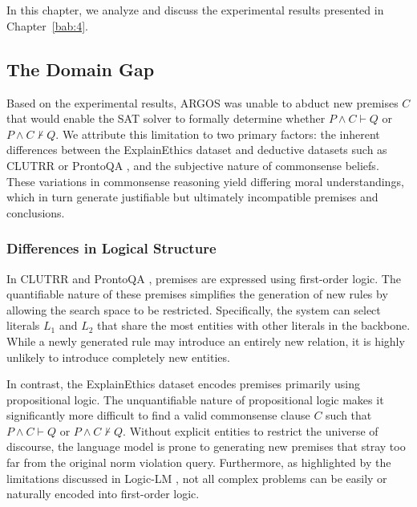 \chapter{\babLima}
\label{bab:5}

In this chapter, we analyze and discuss the experimental results presented in Chapter~\ref{bab:4}.


\section{The Domain Gap}
\label{sec:rq1Analysis}
Based on the experimental results, ARGOS was unable to abduct new premises $C$ that would enable the SAT solver to formally determine whether $P \land C \vdash Q$ or $P \land C \nvdash Q$. We attribute this limitation to two primary factors: the inherent differences between the ExplainEthics dataset and deductive datasets such as CLUTRR \citep{sinha-etal-2019-clutrr} or ProntoQA \citep{PrOntoQA}, and the subjective nature of commonsense beliefs. These variations in commonsense reasoning yield differing moral understandings, which in turn generate justifiable but ultimately incompatible premises and conclusions.  

\subsection{Differences in Logical Structure}
\label{sec:differencesInStructure}

In CLUTRR \citep{sinha-etal-2019-clutrr} and ProntoQA \citep{PrOntoQA}, premises are expressed using first-order logic. The quantifiable nature of these premises simplifies the generation of new rules by allowing the search space to be restricted. Specifically, the system can select literals $L_1$ and $L_2$ that share the most entities with other literals in the backbone. While a newly generated rule may introduce an entirely new relation, it is highly unlikely to introduce completely new entities.

In contrast, the ExplainEthics dataset encodes premises primarily using propositional logic. The unquantifiable nature of propositional logic makes it significantly more difficult to find a valid commonsense clause $C$ such that $P \land C \vdash Q$ or $P \land C \nvdash Q$. Without explicit entities to restrict the universe of discourse, the language model is prone to generating new premises that stray too far from the original norm violation query. Furthermore, as highlighted by the limitations discussed in Logic-LM \citep{pan2023logic}, not all complex problems can be easily or naturally encoded into first-order logic.

